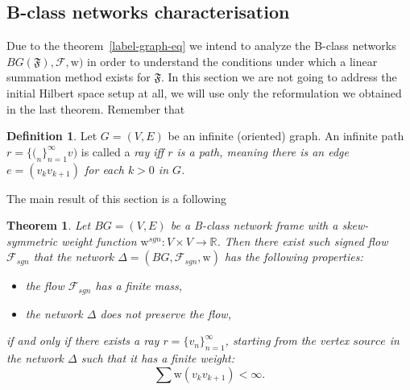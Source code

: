 \documentclass[12pt]{article}
\newtheorem{theorem}{Theorem}
\theoremstyle{definition}
\newtheorem{definition}{Definition}
\newcommand{\seq}[1]{\{{#1}_n\}_{n=1}^\infty}
\newcommand{\fsys}{\mathfrak{F}}
\newcommand{\sgnwt}{\mathrm{w}^{sgn}}
\newcommand{\wt}{\mathrm{w}}
\newcommand{\flow}{\mathcal{F}}
\newcommand{\flowsgn}{\mathcal{F}_{sgn}}
\newcommand{\source}{\mathit{source}}
\newcommand{\net}{\Delta}
\numberwithin{remark}{section}
\numberwithin{theorem}{section}
\numberwithin{prop}{section}
\numberwithin{equation}{section}
\numberwithin{lemma}{section}
\numberwithin{prop_under_lemma}{lemma}
\begin{document}
    \subsection{B-class networks characterisation}
    Due to the theorem~\ref{label-graph-eq} we intend to analyze the B-class networks
    $BG(\fsys), \flow, \wt)$ in order to understand the conditions under which a linear
    summation method exists for $\fsys$.
    In this section we are not going to address the initial Hilbert space setup at all,
    we will use only the reformulation we obtained in the last theorem.
    Remember that
    \begin{definition}
      Let $G = (V, E)$ be an infinite (oriented) graph.
      An infinite path $r = \seq(v)$ is called a \it{ray} iff
      $r$ is a path, meaning there is an edge $e = (v_k v_{k+1})$ for each $k > 0$ in $G$.
    \end{definition}
    The main result of this section is a following
    \begin{theorem}
      Let $BG = (V, E)$ be a B-class network frame with a skew-symmetric weight function $\sgnwt : V \times V \to \mathbb{R}$.
      Then there exist such signed flow $\flowsgn$ that the network $\net = (BG, \flowsgn, \wt)$ has the following properties:
      \begin{itemize}
        \item the flow $\flowsgn$ has a finite mass,
        \item the network $\net$ does not preserve the flow,
      \end{itemize}
      if and only if there exists a ray $r = \seq{v}$, starting from the vertex $\source$
        in the network $\net$ such that it has a finite weight:
      $$
        \sum \wt(v_k v_{k+1}) < \infty.
      $$
    \end{theorem}
\end{document}
